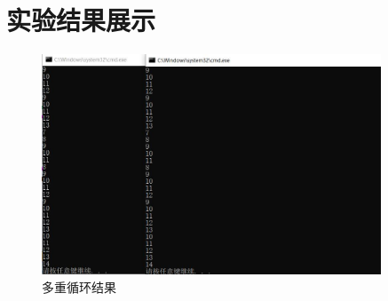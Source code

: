 \section{实验结果展示}

\begin{figure}[H]
    \centering
    \includegraphics[width= 0.9\textwidth]{assets/多重循环结果}
    \caption{多重循环结果}
    \label{多重循环结果}
\end{figure}


